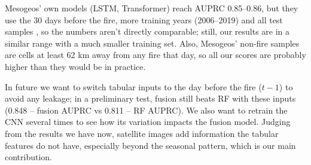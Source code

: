 Mesogeos' own models (LSTM, Transformer) reach AUPRC 0.85--0.86, but they use the 30 days before the fire, more training years (2006--2019) and all test samples \cite{kondylatos2023mesogeos}, so the numbers aren't directly comparable; still, our results are in a similar range with a much smaller training set. Also, Mesogeos' non-fire samples are cells at least 62 km away from any fire that day, so all our scores are probably higher than they would be in practice.

In future we want to switch tabular inputs to the day before the fire ($t-1$) to avoid any leakage; in a preliminary test, fusion still beats RF with these inputs (0.848 -- fusion AUPRC vs 0.811 -- RF AUPRC). We also want to retrain the CNN several times to see how its variation impacts the fusion model. Judging from the results we have now, satellite images add information the tabular features do not have, especially beyond the seasonal pattern, which is our main contribution.